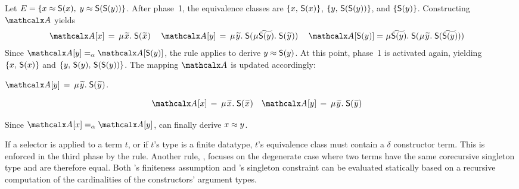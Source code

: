 
\begin{examplex}
Let $E = \{ x \approx \textsf{S}(x),\; y \approx \textsf{S}(\textsf{S}(y)) \}$.
After phase~1, the equivalence classes %
are
$\{ x,\, \textsf{S}(x) \}$,
$\{ y,\, \textsf{S}(\textsf{S}(y)) \}$,
and $\{ \textsf{S}(y) \}$.
Constructing $\Val$ yields
\begin{align*}
\Val \ec{x} & \,=\, \MU {\Varec{x}}.\; \const{S}(\Varec{x}) &
\kern0.25em %
\Val \ec{y} & \,=\,
\MU {\Varec{y}}.\; \const{S}(\smash{\MU {\VAREC{\const{S}(y)}}}.\; \const{S}( {\Varec{y}} ) )
\kern0.25em %
 &
\Val \ec{\const{S}(y)} & =
\MU {\VAREC{\const{S}(y)}}.\; \const{S}(\MU {\Varec{y}}.\; \const{S}( {\VAREC{\const{S}(y)}} ) )
\end{align*}
Since $\Val \ec{y} \aequiv \Val \ec{\const{S}(y)}$,
the  rule applies to derive $y \approx \textsf{S}(y)$.
%
At this point, phase~1 is activated again, %
yielding
$\{ x,\, \textsf{S}(x) \}$ and
$\{ y,\, \textsf{S}(y),\allowbreak\, \textsf{S}(\textsf{S}(y)) \}$.
The mapping $\Val$ is updated accordingly:
\begin{conf}%
$\Val \ec{y} \,=\, \MU {\Varec{y}}.\; \const{S}({\Varec{y}})$.
\end{conf}%
\begin{rep}
\begin{align*}
\Val \ec{x} & \,=\, \MU {\Varec{x}}.\; \const{S}(\Varec{x})
&
\Val \ec{y} & \,=\, \MU {\Varec{y}}.\; \const{S}({\Varec{y}})
\end{align*}
\end{rep}
Since $\Val \ec{x} \aequiv \Val \ec{y}$,
 can finally derive $x \approx y$.
\xend
\end{examplex}

If a selector is applied to a term $t$, or if $t$'s type is a finite datatype,
$t$'s equivalence class must contain a
$\delta$ constructor term.
This is enforced in the third phase by the  rule.
Another rule, , focuses on the degenerate case where two
terms %
have the same corecursive singleton type
and are therefore equal. Both
's finiteness assumption %
and 's singleton
constraint %
can be evaluated statically
based on a recursive computation of the cardinalities of the
constructors' argument types.


